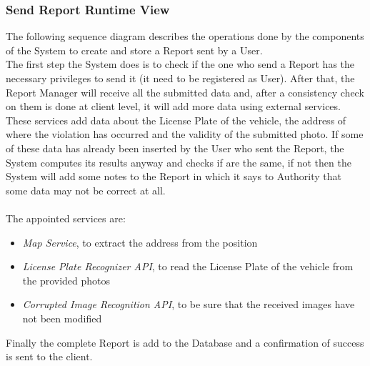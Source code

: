 \subsubsection{Send Report Runtime View}
The following sequence diagram describes the operations done by the components of the System to create and store a Report sent by a User.\\
The first step the System does is to check if the one who send a Report has the necessary privileges to send it (it need to be registered as User). After that, the Report Manager will receive all the submitted data and, after a consistency check on them is done at client level, it will add more data using external services. These services add data about the License Plate of the vehicle, the address of where the violation has occurred and the validity of the submitted photo. If some of these data has already been inserted by the User who sent the Report, the System computes its results anyway and checks if are the same, if not then the System will add some notes to the Report in which it says to Authority that some data may not be correct at all.\\\\
The appointed services are:
\begin{itemize}
    \item \textit{Map Service}, to extract the address from the position
    \item \textit{License Plate Recognizer API}, to read the License Plate of the vehicle from the provided photos
    \item \textit{Corrupted Image Recognition API}, to be sure that the received images have not been modified
\end{itemize}

\noindent Finally the complete Report is add to the Database and a confirmation of success is sent to the client.

